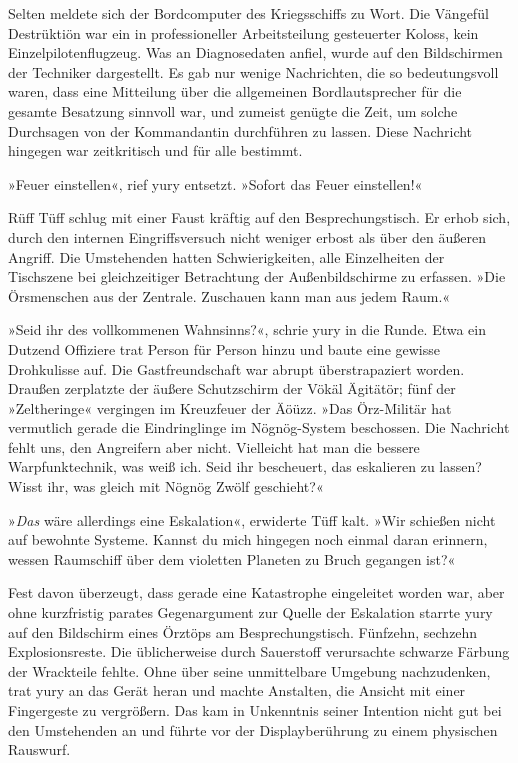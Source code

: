 
Selten meldete sich der Bordcomputer des Kriegsschiffs zu Wort. Die Vängefül Destrüktiön war ein in professioneller Arbeitsteilung gesteuerter Koloss, kein Einzelpilotenflugzeug. Was an Diagnosedaten anfiel, wurde auf den Bildschirmen der Techniker dargestellt. Es gab nur wenige Nachrichten, die so bedeutungsvoll waren, dass eine Mitteilung über die allgemeinen Bordlautsprecher für die gesamte Besatzung sinnvoll war, und zumeist genügte die Zeit, um solche Durchsagen von der Kommandantin durchführen zu lassen. Diese Nachricht hingegen war zeitkritisch und für alle bestimmt.


»Feuer einstellen«, rief yury entsetzt. »Sofort das Feuer einstellen!«

Rüff Tüff schlug mit einer Faust kräftig auf den Besprechungstisch. Er erhob sich, durch den internen Eingriffsversuch nicht weniger erbost als über den äußeren Angriff. Die Umstehenden hatten Schwierigkeiten, alle Einzelheiten der Tischszene bei gleichzeitiger Betrachtung der Außenbildschirme zu erfassen. »Die Örsmenschen aus der Zentrale. Zuschauen kann man aus jedem Raum.«

»Seid ihr des vollkommenen Wahnsinns?«, schrie yury in die Runde. Etwa ein Dutzend Offiziere trat Person für Person hinzu und baute eine gewisse Drohkulisse auf. Die Gastfreundschaft war abrupt überstrapaziert worden. Draußen zerplatzte der äußere Schutzschirm der Vökäl Ägitätör; fünf der »Zeltheringe« vergingen im Kreuzfeuer der Äöüzz. »Das Örz-Militär hat vermutlich gerade die Eindringlinge im Nögnög-System beschossen. Die Nachricht fehlt uns, den Angreifern aber nicht. Vielleicht hat man die bessere Warpfunktechnik, was weiß ich. Seid ihr bescheuert, das eskalieren zu lassen? Wisst ihr, was gleich mit Nögnög Zwölf geschieht?«

»\emph{Das} wäre allerdings eine Eskalation«, erwiderte Tüff kalt. »Wir schießen nicht auf bewohnte Systeme. Kannst du mich hingegen noch einmal daran erinnern, wessen Raumschiff über dem violetten Planeten zu Bruch gegangen ist?«

Fest davon überzeugt, dass gerade eine Katastrophe eingeleitet worden war, aber ohne kurzfristig parates Gegenargument zur Quelle der Eskalation starrte yury auf den Bildschirm eines Örztöps am Besprechungstisch. Fünfzehn, sechzehn Explosionsreste. Die üblicherweise durch Sauerstoff verursachte schwarze Färbung der Wrackteile fehlte. Ohne über seine unmittelbare Umgebung nachzudenken, trat yury an das Gerät heran und machte Anstalten, die Ansicht mit einer Fingergeste zu vergrößern. Das kam in Unkenntnis seiner Intention nicht gut bei den Umstehenden an und führte vor der Displayberührung zu einem physischen Rauswurf.

